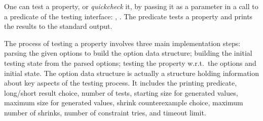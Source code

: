 One can test a property, or \emph{quickcheck} it,  by passing it as a parameter in a
call to a predicate of the \plqc{} testing interface: ,
 .
%
The  predicate tests a property and prints the results
to the standard output.
%
%
%
%
%
%


The process of testing a property 
involves three main implementation steps: parsing the given options to build the option data
structure; building the initial testing state from the parsed options; testing the
property w.r.t.\ the  options and initial state.
%
The option data structure is actually a structure holding information
about key aspects of the testing process.
%
It includes the printing predicate, long/short result choice, number of
tests, starting size for generated values, maximum size for generated
values, shrink counterexample choice, maximum number of shrinks, number
of constraint tries, and timeout limit.

